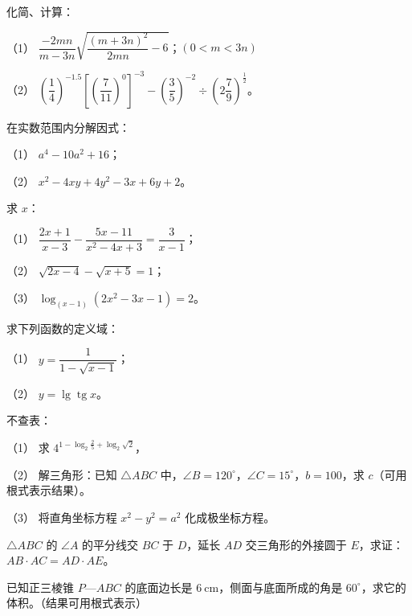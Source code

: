 \begin{question}
化简、计算：

（1） $\dfrac{-2mn}{m-3n}\sqrt{\dfrac{(m+3n)^2}{2mn}-6}$；$(0<m<3n)$

（2） $\left(\dfrac14\right)^{-1.5}\left[\left(\dfrac{7}{11}\right)^0\right]^{-3}-\left(\dfrac35\right)^{-2}\div\left(2\dfrac79\right)^{\frac12}$。

\end{question}
\begin{question}
在实数范围内分解因式：

（1） $a^4-10a^2+16$；

（2） $x^2-4xy+4y^2-3x+6y+2$。

\end{question}
\begin{question}
求 $x$：

（1） $\dfrac{2x+1}{x-3}-\dfrac{5x-11}{x^2-4x+3}=\dfrac{3}{x-1}$；

（2） $\sqrt{2x-4}-\sqrt{x+5}=1$；

（3） $\log_{(x-1)}(2x^2-3x-1)=2$。

\end{question}
\begin{question}
求下列函数的定义域：

（1） $y=\dfrac{1}{1-\sqrt{x-1}}$；

（2） $y=\operatorname{lg}\operatorname{tg}x$。

\end{question}
\begin{question}
不查表：

（1） 求 $4^{1-\log_2\frac{2}{5}+\log_2\sqrt{2}}$，

（2） 解三角形：已知 $\triangle ABC$ 中，$\angle B=120^\circ$，$\angle C=15^\circ$，$b=100$，求 $c$（可用根式表示结果）。

（3） 将直角坐标方程 $x^2-y^2=a^2$ 化成极坐标方程。

\end{question}
\begin{question}
$\triangle ABC$ 的 $\angle A$ 的平分线交 $BC$ 于 $D$，延长 $AD$ 交三角形的外接圆于 $E$，求证：$AB\cdot AC=AD\cdot AE$。

\end{question}
\begin{question}
已知正三棱锥 $P\text{—}ABC$ 的底面边长是 $6\ \mathrm{cm}$，侧面与底面所成的角是 $60^\circ$，求它的体积。（结果可用根式表示）

\end{question}
